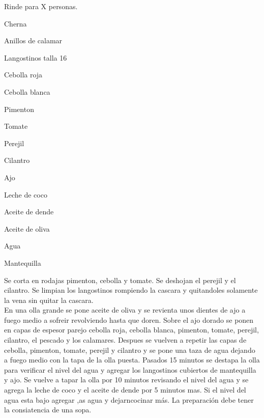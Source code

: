
Rinde para X personas.

\begin{ingredientes}
\item Cherna
\item Anillos de calamar
\item Langostinos talla 16
\item Cebolla roja
\item Cebolla blanca
\item Pimenton
\item Tomate
\item Perejil
\item Cilantro
\item Ajo
\item Leche de coco
\item Aceite de dende
\item Aceite de oliva
\item Agua
\item Mantequilla
\end{ingredientes}

\preparacion
Se corta en rodajas pimenton, cebolla y tomate. Se deshojan el perejil y el cilantro. Se limpian los langostinos rompiendo la cascara y quitandoles solamente la vena sin quitar la cascara.\\

En una olla grande se pone aceite de oliva y se revienta unos dientes de ajo a fuego medio a sofreir revolviendo hasta que doren. Sobre el ajo dorado se ponen en capas de espesor parejo cebolla roja, cebolla blanca, pimenton, tomate, perejil, cilantro, el pescado y los calamares. Despues se vuelven a repetir las capas de cebolla, pimenton, tomate, perejil y cilantro y se pone una taza de agua dejando a fuego medio con la tapa de la olla puesta. Pasados 15 minutos se destapa la olla para verificar el nivel del agua y agregar los langostinos cubiertos de mantequilla y ajo. Se vuelve a tapar la olla por 10 minutos revisando el nivel del agua y se agrega la leche de coco y el aceite de dende por 5 minutos mas. Si el nivel del agua esta bajo agregar ,as agua y dejarncocinar más. La preparación debe tener la consiatencia de una sopa.